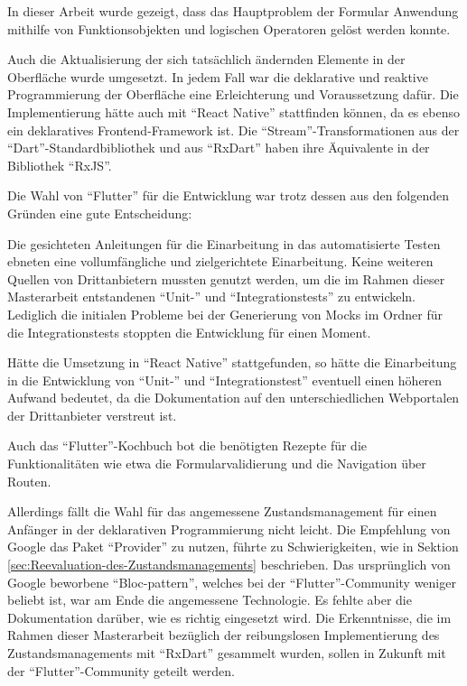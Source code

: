 

In dieser Arbeit wurde gezeigt, dass  das Hauptproblem der Formular Anwendung mithilfe von Funktionsobjekten und logischen Operatoren gelöst werden konnte.

Auch die  Aktualisierung der sich tatsächlich ändernden Elemente in der Oberfläche wurde umgesetzt.
In jedem Fall war die deklarative und reaktive Programmierung der Oberfläche eine Erleichterung und Voraussetzung dafür.
Die Implementierung hätte auch mit \enquote{React Native} stattfinden können,
da es ebenso ein deklaratives Frontend-Framework ist.
Die \enquote{Stream}-Transformationen aus der \enquote{Dart}-Standardbibliothek und aus \enquote{RxDart} haben ihre Äquivalente in der Bibliothek \enquote{RxJS}.

Die Wahl von \enquote{Flutter} für die Entwicklung war trotz dessen aus den folgenden Gründen eine gute Entscheidung:

Die gesichteten Anleitungen für die Einarbeitung in das automatisierte Testen ebneten eine vollumfängliche und zielgerichtete Einarbeitung.
Keine weiteren Quellen von Drittanbietern mussten genutzt werden,
um die im Rahmen dieser Masterarbeit entstandenen \enquote{Unit-} und \enquote{Integrationstests} zu entwickeln.
Lediglich die initialen Probleme bei der Generierung von Mocks im Ordner für die Integrationstests stoppten die Entwicklung für einen Moment.

Hätte die Umsetzung in \enquote{React Native} stattgefunden,
so hätte die Einarbeitung in die Entwicklung von \enquote{Unit-} und \enquote{Integrationstest} eventuell einen höheren Aufwand bedeutet,
da die Dokumentation auf den unterschiedlichen Webportalen der Drittanbieter verstreut ist.

Auch das \enquote{Flutter}-Kochbuch bot die benötigten Rezepte für die Funktionalitäten wie etwa die Formularvalidierung und
die Navigation über Routen.

Allerdings fällt die Wahl für das angemessene Zustandsmanagement für einen Anfänger in der deklarativen Programmierung nicht leicht.
Die Empfehlung von Google das Paket \enquote{Provider} zu nutzen, führte zu Schwierigkeiten,
wie in Sektion \ref{sec:Reevaluation-des-Zustandsmanagements}
beschrieben.
Das ursprünglich von Google beworbene \enquote{Bloc-pattern},
welches bei der \enquote{Flutter}-Community weniger beliebt ist,
war am Ende die angemessene Technologie.
Es fehlte aber die Dokumentation darüber,
wie es richtig eingesetzt wird.
Die Erkenntnisse,
die im Rahmen dieser Masterarbeit bezüglich der reibungslosen Implementierung des Zustandsmanagements mit \enquote{RxDart} gesammelt wurden,
sollen in Zukunft mit der \enquote{Flutter}-Community geteilt werden.

